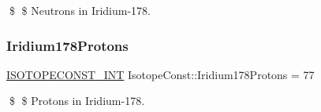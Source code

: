 \$ \$ Neutrons in Iridium-\/178. \mbox{\label{group___isotope_const-_iridium-_ir178_gad3e12407cd894127aaf9864c94b20f18}} 
\subsubsection{\texorpdfstring{Iridium178\+Protons}{Iridium178Protons}}
{\footnotesize\ttfamily \mbox{\hyperlink{group___isotope_const-_macros_ga5f18360b3e99483a35c32d789e62621c}{I\+S\+O\+T\+O\+P\+E\+C\+O\+N\+S\+T\+\_\+\+I\+NT}} Isotope\+Const\+::\+Iridium178\+Protons = 77}

\$ \$ Protons in Iridium-\/178. 